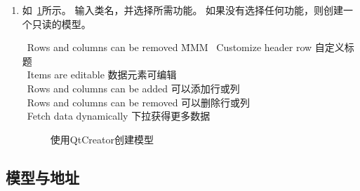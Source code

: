 \begin{enumerate}
\item 如\figurename\ \ref{p000046}所示。
输入类名，并选择所需功能。
如果没有选择任何功能，则创建一个只读的模型。
\begin{tabbing}
\textbullet\ Rows and columns can be removed \hspace{2em} \= MMM \kill
\textbullet\ Customize header row\>
自定义标题 \\
\textbullet\ Items are editable \>
数据元素可编辑 \\
\textbullet\ Rows and columns can be added \>
可以添加行或列 \\
\textbullet\ Rows and columns can be removed \>
可以删除行或列 \\
\textbullet\ Fetch data dynamically \>
下拉获得更多数据
\end{tabbing}

\FloatBarrier
\begin{figure}[htb] %
\marginnote{\setlength\fboxsep{2pt}\fbox{\footnotesize{\kaishu\figurename\,}\footnotesize{\ref{p000046}}}}\centering %
\setlength\fboxsep{0pt} %
\caption{使用QtCreator创建模型} %
\label{p000046} %
\end{figure}


\end{enumerate}

\FloatBarrier
\subsection{
模型与地址
}\label{c000019s01s03}


